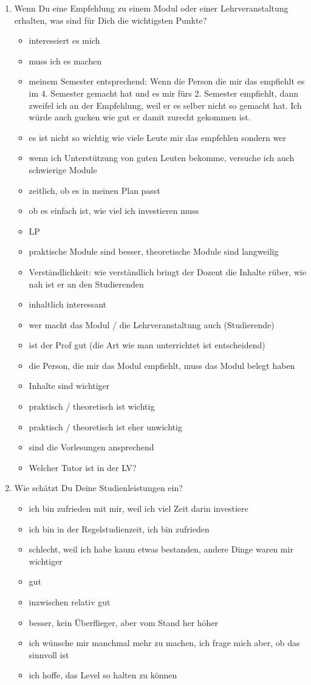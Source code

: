 \documentclass{article}
\begin{document}
\begin{enumerate}
\item Wenn Du eine Empfehlung zu einem Modul oder einer Lehrveranstaltung erhalten, was sind für Dich die wichtigsten Punkte?
\begin{itemize}
\item interessiert es mich
\item muss ich es machen
\item meinem Semester entsprechend: Wenn die Person die mir das empfiehlt es im 4. Semester gemacht hat und es mir fürs 2. Semester empfiehlt, dann zweifel ich an der Empfehlung, weil er es selber nicht so gemacht hat. Ich würde auch gucken wie gut er damit zurecht gekommen ist.
\item es ist nicht so wichtig wie viele Leute mir das empfehlen sondern wer
\item wenn ich Unterstützung von guten Leuten bekomme, versuche ich auch schwierige Module
\item zeitlich, ob es in meinen Plan passt
\item ob es einfach ist, wie viel ich investieren muss
\item LP
\item praktische Module sind besser, theoretische Module sind langweilig
\item Verständlichkeit: wie verständlich bringt der Dozent die Inhalte rüber, wie nah ist er an den Studierenden
\item inhaltlich interessant
\item wer macht das Modul / die Lehrveranstaltung auch (Studierende)
\item ist der Prof gut (die Art wie man unterrichtet ist entscheidend)
\item die Person, die mir das Modul empfiehlt, muss das Modul belegt haben
\item Inhalte sind wichtiger
\item praktisch / theoretisch ist wichtig
\item praktisch / theoretisch ist eher unwichtig
\item sind die Vorlesungen ansprechend
\item Welcher Tutor ist in der LV?
\end{itemize}

\item Wie schätzt Du Deine Studienleistungen ein?
\begin{itemize}
\item ich bin zufrieden mit mir, weil ich viel Zeit darin investiere
\item ich bin in der Regelstudienzeit, ich bin zufrieden
\item schlecht, weil ich habe kaum etwas bestanden, andere Dinge waren mir wichtiger
\item gut
\item inzwischen relativ gut
\item besser, kein Überflieger, aber vom Stand her höher
\item ich wünsche mir manchmal mehr zu machen, ich frage mich aber, ob das sinnvoll ist
\item ich hoffe, das Level so halten zu können
\end{itemize}
\end{enumerate}
\end{document}
